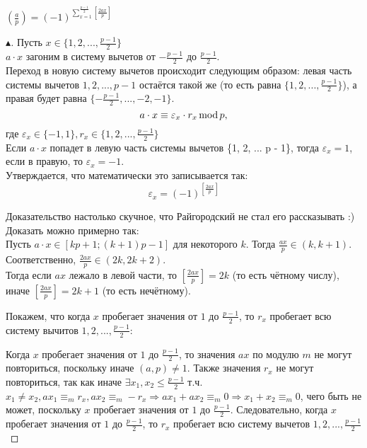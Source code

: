 \begin{theorem}
    $\left(\frac{a}{p}\right) = (-1)^{ \sum \limits_{x=1}^{ \frac{p-1}{2} } \left[ \frac{2ax}{p} \right] }$
    \begin{proof}[$\blacktriangle$]
        Пусть $x \in \{1, 2, ..., \frac{p - 1}{2}\}$\\
        $a \cdot x$ загоним в систему вычетов от $-\frac{p-1}{2}$ до $\frac{p-1}{2}$.\\
        
        Переход в новую систему вычетов происходит следующим образом: левая часть системы вычетов ${1, 2, ..., p - 1}$ остаётся такой же (то есть равна $\{1, 2, ..., \frac{p - 1}{2}\}$), а правая будет равна $\{-\frac{p - 1}{2}, ..., -2, -1\}$.\\
        
        $$
            a \cdot x \equiv \varepsilon_x \cdot r_x \operatorname{mod}{p},
        $$ где $\varepsilon_x \in \{-1, 1\}, r_x \in \{1, 2, ..., \frac{p-1}{2}\}$\\
        
        Если $a \cdot x$ попадет в левую часть системы вычетов \{1, 2, ... p - 1\}, тогда $\varepsilon_x = 1$, если в правую, то $\varepsilon_x = -1$.\\
        
        Утверждается, что математически это записывается так:
        $$
            \varepsilon_x = (-1)^{\left[ \frac{2ax}{p} \right]}
        $$
        
        Доказательство настолько скучное, что Райгородский не стал его рассказывать :) Доказать можно примерно так:\\
        
        Пусть $a \cdot x \in [kp + 1; (k + 1)p - 1]$ для некоторого $k$. Тогда $\frac{ax}{p} \in (k, k + 1)$. Соответственно, $\frac{2ax}{p} \in (2k, 2k + 2)$.\\
        
        Тогда если $ax$ лежало в левой части, то $\left[ \frac{2ax}{p} \right] = 2k$ (то есть чётному числу), иначе $\left[ \frac{2ax}{p} \right] = 2k + 1$ (то есть нечётному).
        
        Покажем, что когда $x$ пробегает значения от $1$ до $\frac{p-1}{2}$, то $r_x$ пробегает всю систему вычитов $1, 2, ..., \frac{p-1}{2}$:
        
        Когда $x$ пробегает значения от $1$ до $\frac{p-1}{2}$, то значения $ax$ по модулю $m$ не могут повториться, поскольку иначе $(a, p) \neq 1$. Также значения $r_x$ не могут повториться, так как иначе $\exists x_1, x_2 \leq \frac{p-1}{2}$ т.ч. $x_1 \neq x_2, ax_1 \equiv_m r_x, ax_2 \equiv_m -r_x \Rightarrow ax_1 + ax_2 \equiv_m 0 \Rightarrow x_1 + x_2 \equiv_m 0$, чего быть не может, поскольку $x$ пробегает значения от $1$ до $\frac{p-1}{2}$. Следовательно, когда $x$ пробегает значения от $1$ до $\frac{p-1}{2}$, то $r_x$ пробегает всю систему вычетов $1, 2, ..., \frac{p-1}{2}$
        

\end{proof}
\end{theorem}
